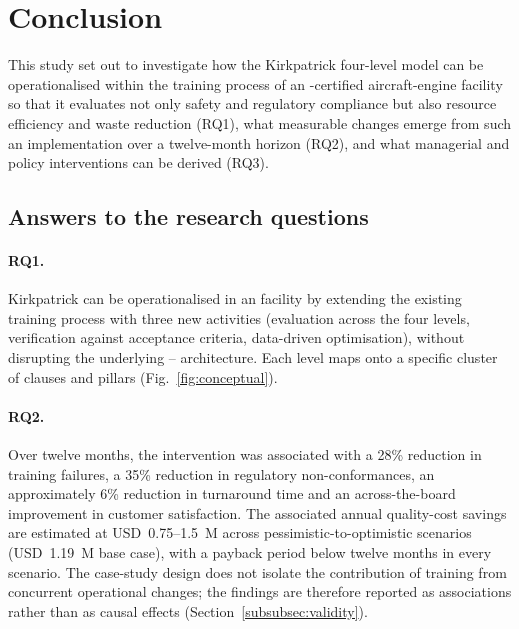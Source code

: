 \section{Conclusion}
\label{sec:conclusion}

This study set out to investigate how the Kirkpatrick four-level model can
be operationalised within the training process of an \AS{}-certified
aircraft-engine \MRO{} facility so that it evaluates not only safety and
regulatory compliance but also resource efficiency and waste reduction
(RQ1), what measurable changes emerge from such an implementation over a
twelve-month horizon (RQ2), and what managerial and policy interventions
can be derived (RQ3).

\subsection{Answers to the research questions}
\label{subsec:rq-answers}

\paragraph{RQ1.} Kirkpatrick can be operationalised in an \AS{} \MRO{}
facility by extending the existing training process with three new
activities (evaluation across the four levels, verification against
acceptance criteria, data-driven optimisation), without disrupting the
underlying \LMS{}--\ERP{} architecture. Each level maps onto a specific
cluster of \AS{} clauses and \SMS{} pillars
(Fig.~\ref{fig:conceptual}).

\paragraph{RQ2.} Over twelve months, the intervention was associated
with a 28\% reduction in training failures, a 35\% reduction in
regulatory non-conformances, an approximately 6\% reduction in turnaround
time and an across-the-board improvement in customer satisfaction. The
associated annual quality-cost savings are estimated at USD~0.75--1.5~M
across pessimistic-to-optimistic scenarios (USD~1.19~M base case), with a
payback period below twelve months in every scenario. The case-study
design does not isolate the contribution of training from concurrent
operational changes; the findings are therefore reported as associations
rather than as causal effects (Section~\ref{subsubsec:validity}).

